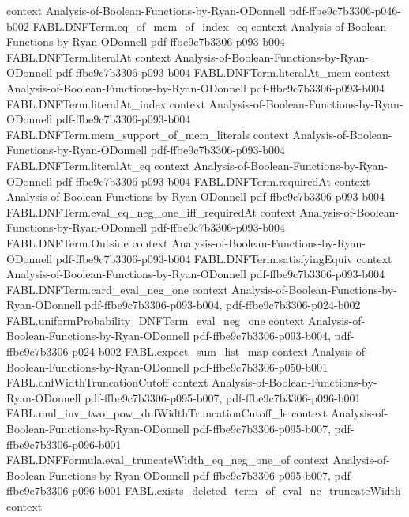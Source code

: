 \begin{theorem}
  {context}
  {Analysis-of-Boolean-Functions-by-Ryan-ODonnell}
  {pdf-ffbe9c7b3306-p046-b002}
\proofstep
  {FABL.DNFTerm.eq_of_mem_of_index_eq}
  {context}
  {Analysis-of-Boolean-Functions-by-Ryan-ODonnell}
  {pdf-ffbe9c7b3306-p093-b004}
\proofstep
  {FABL.DNFTerm.literalAt}
  {context}
  {Analysis-of-Boolean-Functions-by-Ryan-ODonnell}
  {pdf-ffbe9c7b3306-p093-b004}
\proofstep
  {FABL.DNFTerm.literalAt_mem}
  {context}
  {Analysis-of-Boolean-Functions-by-Ryan-ODonnell}
  {pdf-ffbe9c7b3306-p093-b004}
\proofstep
  {FABL.DNFTerm.literalAt_index}
  {context}
  {Analysis-of-Boolean-Functions-by-Ryan-ODonnell}
  {pdf-ffbe9c7b3306-p093-b004}
\proofstep
  {FABL.DNFTerm.mem_support_of_mem_literals}
  {context}
  {Analysis-of-Boolean-Functions-by-Ryan-ODonnell}
  {pdf-ffbe9c7b3306-p093-b004}
\proofstep
  {FABL.DNFTerm.literalAt_eq}
  {context}
  {Analysis-of-Boolean-Functions-by-Ryan-ODonnell}
  {pdf-ffbe9c7b3306-p093-b004}
\proofstep
  {FABL.DNFTerm.requiredAt}
  {context}
  {Analysis-of-Boolean-Functions-by-Ryan-ODonnell}
  {pdf-ffbe9c7b3306-p093-b004}
\proofstep
  {FABL.DNFTerm.eval_eq_neg_one_iff_requiredAt}
  {context}
  {Analysis-of-Boolean-Functions-by-Ryan-ODonnell}
  {pdf-ffbe9c7b3306-p093-b004}
\proofstep
  {FABL.DNFTerm.Outside}
  {context}
  {Analysis-of-Boolean-Functions-by-Ryan-ODonnell}
  {pdf-ffbe9c7b3306-p093-b004}
\proofstep
  {FABL.DNFTerm.satisfyingEquiv}
  {context}
  {Analysis-of-Boolean-Functions-by-Ryan-ODonnell}
  {pdf-ffbe9c7b3306-p093-b004}
\proofstep
  {FABL.DNFTerm.card_eval_neg_one}
  {context}
  {Analysis-of-Boolean-Functions-by-Ryan-ODonnell}
  {pdf-ffbe9c7b3306-p093-b004,
    pdf-ffbe9c7b3306-p024-b002}
\proofstep
  {FABL.uniformProbability_DNFTerm_eval_neg_one}
  {context}
  {Analysis-of-Boolean-Functions-by-Ryan-ODonnell}
  {pdf-ffbe9c7b3306-p093-b004,
    pdf-ffbe9c7b3306-p024-b002}
\proofstep
  {FABL.expect_sum_list_map}
  {context}
  {Analysis-of-Boolean-Functions-by-Ryan-ODonnell}
  {pdf-ffbe9c7b3306-p050-b001}
\proofstep
  {FABL.dnfWidthTruncationCutoff}
  {context}
  {Analysis-of-Boolean-Functions-by-Ryan-ODonnell}
  {pdf-ffbe9c7b3306-p095-b007,
    pdf-ffbe9c7b3306-p096-b001}
\proofstep
  {FABL.mul_inv_two_pow_dnfWidthTruncationCutoff_le}
  {context}
  {Analysis-of-Boolean-Functions-by-Ryan-ODonnell}
  {pdf-ffbe9c7b3306-p095-b007,
    pdf-ffbe9c7b3306-p096-b001}
\proofstep
  {FABL.DNFFormula.eval_truncateWidth_eq_neg_one_of}
  {context}
  {Analysis-of-Boolean-Functions-by-Ryan-ODonnell}
  {pdf-ffbe9c7b3306-p095-b007,
    pdf-ffbe9c7b3306-p096-b001}
\proofstep
  {FABL.exists_deleted_term_of_eval_ne_truncateWidth}
  {context}

\end{theorem}

